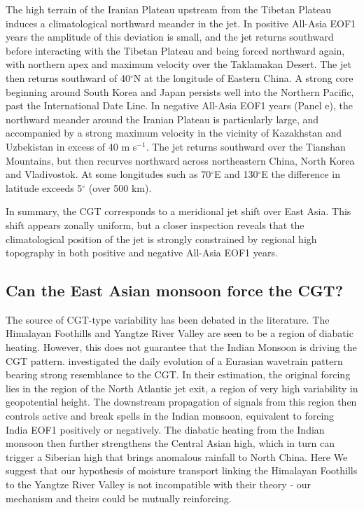 	The high terrain of the Iranian Plateau upstream from the Tibetan Plateau induces a climatological northward meander in the jet. In positive All-Asia EOF1 years the amplitude of this deviation is small, and the jet returns southward before interacting with the Tibetan Plateau and being forced northward again, with northern apex and maximum velocity over the Taklamakan Desert. The jet then returns southward of 40$^{\circ}$N at the longitude of Eastern China. A strong core beginning around South Korea and Japan persists well into the Northern Pacific, past the International Date Line. In negative All-Asia EOF1 years (Panel e), the northward meander around the Iranian Plateau is particularly large, and accompanied by a strong maximum velocity in the vicinity of Kazakhstan and Uzbekistan in excess of 40 m s$^{-1}$. The jet returns southward over the Tianshan Mountains, but then recurves northward across northeastern China, North Korea and Vladivostok. At some longitudes such as 70$^{\circ}$E and 130$^{\circ}$E the difference in latitude exceeds 5$^{\circ}$ (over 500 km).
	
	In summary, the CGT corresponds to a meridional jet shift over East Asia. This shift appears zonally uniform, but a closer inspection reveals that the climatological position of the jet is strongly constrained by regional high topography in both positive and negative All-Asia EOF1 years.
	
\subsection{Can the East Asian monsoon force the CGT?}

	The source of CGT-type variability has been debated in the literature. The Himalayan Foothills and Yangtze River Valley are seen to be a region of diabatic heating. However, this does not guarantee that the Indian Monsoon is driving the CGT pattern. \citet{Ding2007} investigated the daily evolution of a Eurasian wavetrain pattern bearing strong resemblance to the CGT. In their estimation, the original forcing lies in the region of the North Atlantic jet exit, a region of very high variability in geopotential height. The downstream propagation of signals from this region then controls active and break spells in the Indian monsoon, equivalent to forcing India EOF1 positively or negatively. The diabatic heating from the Indian monsoon then further strengthens the Central Asian high, which in turn can trigger a Siberian high that brings anomalous rainfall to North China. Here We suggest that our hypothesis of moisture transport linking the Himalayan Foothills to the Yangtze River Valley \citep{Day2015} is not incompatible with their theory - our mechanism and theirs could be mutually reinforcing.

